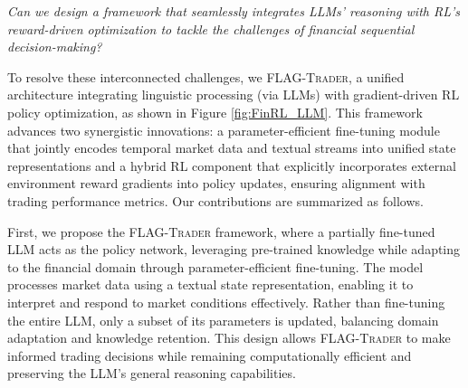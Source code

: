 
\vspace{-0.1in}
\begin{tcolorbox}[colback=white!5!white,colframe=white!75!white]
\textit{
Can we design a framework that seamlessly integrates LLMs' reasoning with RL's reward-driven optimization to tackle the challenges of financial sequential decision-making? }
\end{tcolorbox}
\vspace{-0.15in}



To resolve these interconnected challenges, we \textsc{FLAG-Trader}, a unified architecture integrating linguistic processing (via LLMs) with gradient-driven RL policy optimization, as shown in Figure \ref{fig:FinRL_LLM}. This framework advances two synergistic innovations: a parameter-efficient fine-tuning module that jointly encodes temporal market data and textual streams into unified state representations and a hybrid RL component that explicitly incorporates external environment reward gradients into policy updates, ensuring alignment with trading performance metrics.  Our contributions are summarized as follows.

First, we propose the \textsc{FLAG-Trader} framework, where a partially fine-tuned LLM acts as the policy network, leveraging pre-trained knowledge while adapting to the financial domain through parameter-efficient fine-tuning. The model processes market data using a textual state representation, enabling it to interpret and respond to market conditions effectively. Rather than fine-tuning the entire LLM, only a subset of its parameters is updated, balancing domain adaptation and knowledge retention. This design allows \textsc{FLAG-Trader} to make informed trading decisions while remaining computationally efficient and preserving the LLM’s general reasoning capabilities.

